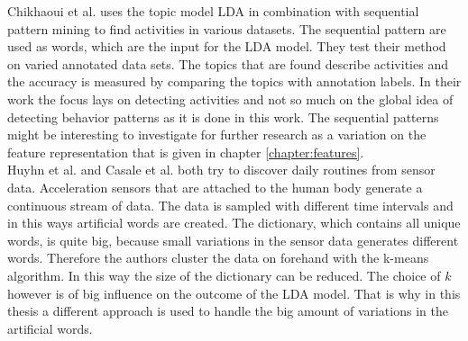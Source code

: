Chikhaoui et al. \cite{journals/percom/ChikhaouiWP12} uses the topic model LDA in combination with sequential pattern mining to find activities in various datasets. The sequential pattern are used as words, which are the input for the LDA model.  They test their method on varied annotated data sets. The topics that are found describe activities and the accuracy is measured by comparing the topics with annotation labels. In their work the focus lays on detecting activities and not so much on the global idea of detecting behavior patterns as it is done in this work. The sequential patterns might be interesting to investigate for further research as a variation on the feature representation that is given in chapter \ref{chapter:features}.\\

Huyhn et al. \cite{Huynh:2008:DAP:1409635.1409638} and Casale et al. \cite{Casale:2009} both try to discover daily routines from sensor data. Acceleration sensors that are attached to the human body generate a continuous stream of data. The data is sampled with different time intervals and in this ways artificial words are created. The dictionary, which contains all unique words, is quite big, because small variations in the sensor data generates different words. Therefore the authors cluster the data on forehand with the k-means algorithm. In this way the size of the dictionary can be reduced. The choice of $k$ however is of big influence on the outcome of the LDA model. That is why in this thesis a different approach is used to handle the big amount of variations in the artificial words.\\


% 
% 
% 
% 
% 

